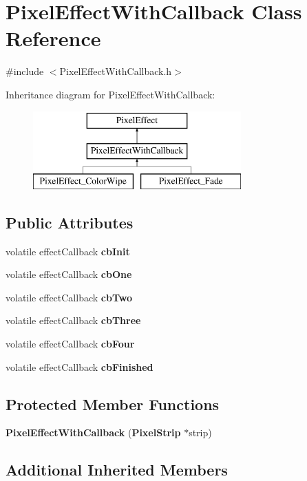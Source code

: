\section{Pixel\+Effect\+With\+Callback Class Reference}
\label{class_pixel_effect_with_callback}


{\ttfamily \#include $<$Pixel\+Effect\+With\+Callback.\+h$>$}

Inheritance diagram for Pixel\+Effect\+With\+Callback\+:\begin{figure}[H]
\begin{center}
\leavevmode
\includegraphics[height=3.000000cm]{class_pixel_effect_with_callback}
\end{center}
\end{figure}
\subsection*{Public Attributes}
\begin{DoxyCompactItemize}
\item 
volatile effect\+Callback {\bf cb\+Init}
\item 
volatile effect\+Callback {\bf cb\+One}
\item 
volatile effect\+Callback {\bf cb\+Two}
\item 
volatile effect\+Callback {\bf cb\+Three}
\item 
volatile effect\+Callback {\bf cb\+Four}
\item 
volatile effect\+Callback {\bf cb\+Finished}
\end{DoxyCompactItemize}
\subsection*{Protected Member Functions}
\begin{DoxyCompactItemize}
\item 
{\bf Pixel\+Effect\+With\+Callback} ({\bf Pixel\+Strip} $\ast$strip)
\end{DoxyCompactItemize}
\subsection*{Additional Inherited Members}


